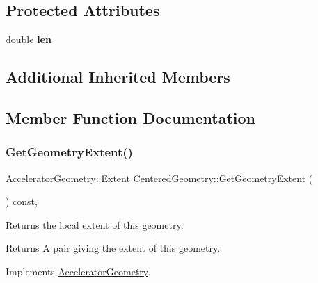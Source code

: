 \subsection*{Protected Attributes}
\begin{DoxyCompactItemize}
\item 
\mbox{\label{classCenteredGeometry_a0e05846708a78529814ed74b1ec6a2cb}} 
double {\bfseries len}
\end{DoxyCompactItemize}
\subsection*{Additional Inherited Members}


\subsection{Member Function Documentation}
\mbox{\label{classCenteredGeometry_abd27afe15472ebd057d0b60f1d531a1a}} 
\subsubsection{\texorpdfstring{Get\+Geometry\+Extent()}{GetGeometryExtent()}}
{\footnotesize\ttfamily Accelerator\+Geometry\+::\+Extent Centered\+Geometry\+::\+Get\+Geometry\+Extent (\begin{DoxyParamCaption}{ }\end{DoxyParamCaption}) const\hspace{0.3cm}{\ttfamily [inline]}, {\ttfamily [virtual]}}

Returns the local extent of this geometry. \begin{DoxyReturn}{Returns}
A pair giving the extent of this geometry. 
\end{DoxyReturn}


Implements \hyperlink{classAcceleratorGeometry_a2db830fe927af3c9cba59b8452370bfb}{Accelerator\+Geometry}.

\mbox{\label{classCenteredGeometry_afe03a287567dec16f8663f4211f82add}} 
